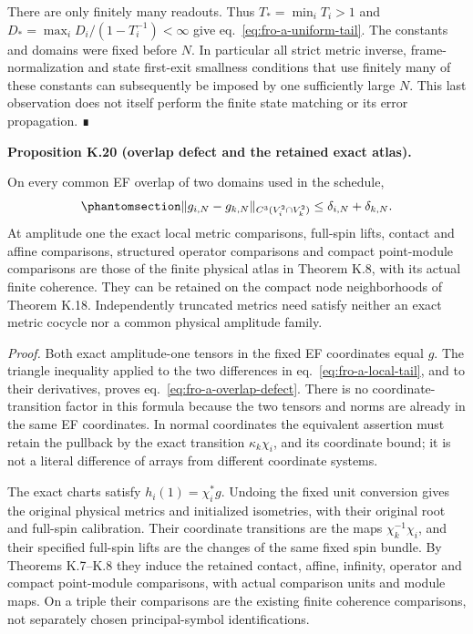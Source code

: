 \documentclass[
  english,
  11pt,
  reqno]{amsart}
\makeatletter
\newcommand{\pandocstatementheading}[1]{%
  \par\addpenalty{\@beginparpenalty}%
  \addvspace{.5\baselineskip plus .2\baselineskip minus .2\baselineskip}%
  {\normalfont\bfseries #1\par}%
  \nobreak\@afterindenttrue\@afterheading
}
\makeatother
\begin{document}
There are only finitely many readouts. Thus \(T_*=\min_iT_i>1\) and
\(D_*=\max_i D_i/(1-T_i^{-1})<\infty\) give
eq.~\ref{eq:fro-a-uniform-tail}. The constants and domains were fixed
before \(N\). In particular all strict metric inverse,
frame-normalization and state first-exit smallness conditions that use
finitely many of these constants can subsequently be imposed by one
sufficiently large \(N\). This last observation does not itself perform
the finite state matching or its error propagation. ∎

\pandocstatementheading{\protect{}\label{prop:fro-a-overlaps-exact-atlas}Proposition K.20 (overlap defect and the retained exact atlas).}

On every common EF overlap of two domains used in the schedule,
\begin{equation}\protect\phantomsection\label{eq:fro-a-overlap-defect}{
 \|g_{i,N}-g_{k,N}\|_{C^3(V_i^2\cap V_k^2)}
     \le\delta_{i,N}+\delta_{k,N}.
}\end{equation} At amplitude one the exact local metric comparisons,
full-spin lifts, contact and affine comparisons, structured operator
comparisons and compact point-module comparisons are those of the finite
physical atlas in Theorem K.8, with its actual finite coherence. They
can be retained on the compact node neighborhoods of Theorem K.18.
Independently truncated metrics need satisfy neither an exact metric
cocycle nor a common physical amplitude family.

\emph{Proof.} Both exact amplitude-one tensors in the fixed EF
coordinates equal \(g\). The triangle inequality applied to the two
differences in eq.~\ref{eq:fro-a-local-tail}, and to their derivatives,
proves eq.~\ref{eq:fro-a-overlap-defect}. There is no
coordinate-transition factor in this formula because the two tensors and
norms are already in the same EF coordinates. In normal coordinates the
equivalent assertion must retain the pullback by the exact transition
\(\kappa_k\chi_i\), and its coordinate bound; it is not a literal
difference of arrays from different coordinate systems.

The exact charts satisfy \(h_i(1)=\chi_i^*g\). Undoing the fixed unit
conversion gives the original physical metrics and initialized
isometries, with their original root and full-spin calibration. Their
coordinate transitions are the maps \(\chi_k^{-1}\chi_i\), and their
specified full-spin lifts are the changes of the same fixed spin bundle.
By Theorems K.7--K.8 they induce the retained contact, affine, infinity,
operator and compact point-module comparisons, with actual comparison
units and module maps. On a triple their comparisons are the existing
finite coherence comparisons, not separately chosen principal-symbol
identifications.
\end{document}

